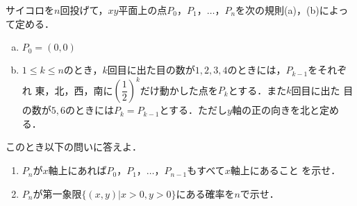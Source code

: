 \documentclass[a4j]{jarticle}
\begin{document}

\begin{oframed}
サイコロを$n$回投げて，$xy$平面上の点$P_0$，$P_1$，$\dots$，$P_n$を次の規則(a)，(b)によって定める．
     \begin{enumerate}[(a)]
     \item $P_0=(0,0)$ 
     \item $1\le k\le n$のとき，$k$回目に出た目の数が$1,2,3,4$のときには，$P_{k-1}$をそれぞれ
     東，北，西，南に$\left(\dfrac{1}{2}\right)^k$だけ動かした点を$P_k$とする．また$k$回目に出た
     目の数が$5,6$のときには$P_k=P_{k-1}$とする．ただし$y$軸の正の向きを北と定める．
     \end{enumerate}
このとき以下の問いに答えよ．
     \begin{enumerate}[(1)]
     \item $P_n$が$x$軸上にあれば$P_0$，$P_1$，$\dots$，$P_{n-1}$もすべて$x$軸上にあること
     を示せ．
     \item $P_n$が第一象限$\{(x,y)|x>0,y>0\}$にある確率を$n$で示せ．
     \end{enumerate}
\end{oframed}
\end{document}
